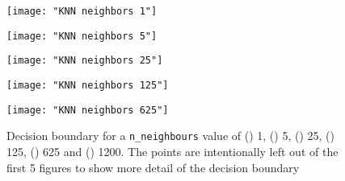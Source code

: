 \documentclass[12pt]{article}
\begin{document}
\begin{figure}[htbp]
\centering
\begin{minipage}{0.3\linewidth}%
  \centering
  \texttt{[image: "KNN neighbors 1"]}%
\label{fig:KNN1a}%
\end{minipage}%
\begin{minipage}{0.3\linewidth}%
  \centering
  \texttt{[image: "KNN neighbors 5"]}%
\label{fig:KNN1b}%
\end{minipage}%
\begin{minipage}{0.3\linewidth}%
  \centering
  \texttt{[image: "KNN neighbors 25"]}%
\label{fig:KNN1c}%
\end{minipage}
\newline
\centering
\begin{minipage}{0.3\linewidth}%
  \centering
  \texttt{[image: "KNN neighbors 125"]}%
\label{fig:KNN1d}%
\end{minipage}%
\begin{minipage}{0.3\linewidth}%
  \centering
  \texttt{[image: "KNN neighbors 625"]}%
\label{fig:KNN1e}%
\end{minipage}%
\begin{minipage}{0.3\linewidth}%
  \centering
\label{fig:KNN1f}%
\end{minipage}%

\caption{ \label{fig:nneighbors} Decision boundary for a \texttt{n\_neighbours} value of () 1, () 5, () 25, () 125, () 625 and () 1200.
The points are intentionally left out of the first 5 figures to show more detail of the decision boundary}
\end{figure}
\end{document}
